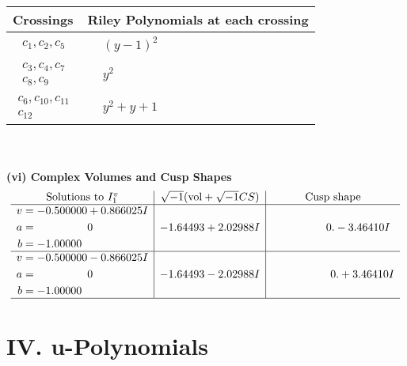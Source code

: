 \documentclass[1p]{elsarticle_modified}
\theoremstyle{definition}
\newcommand{\I}{\sqrt{-1}}
\begin{document}
\begin{tabular}{m{50pt}|m{274pt}}
Crossings & \hspace{64pt}Riley Polynomials at each crossing \\
\hline $$\begin{aligned}c_{1},c_{2},c_{5}\end{aligned}$$&$\begin{aligned}
&(y-1)^2
\end{aligned}$\\
\hline $$\begin{aligned}c_{3},c_{4},c_{7}\\c_{8},c_{9}\end{aligned}$$&$\begin{aligned}
&y^2
\end{aligned}$\\
\hline $$\begin{aligned}c_{6},c_{10},c_{11}\\c_{12}\end{aligned}$$&$\begin{aligned}
&y^2+y+1
\end{aligned}$\\
\hline
\end{tabular}\\~\\
\newpage\flushleft \textbf{(vi) Complex Volumes and Cusp Shapes}
$$\begin{array}{c|c|c}  
\text{Solutions to }I^v_{1}& \I (\text{vol} + \sqrt{-1}CS) & \text{Cusp shape}\\
 \hline 
\begin{aligned}
v &= -0.500000 + 0.866025 I \\
a &= \phantom{-0.000000 } 0 \\
b &= -1.00000\phantom{ +0.000000I}\end{aligned}
 & -1.64493 + 2.02988 I & \phantom{-0.000000 } 0. - 3.46410 I \\ \hline\begin{aligned}
v &= -0.500000 - 0.866025 I \\
a &= \phantom{-0.000000 } 0 \\
b &= -1.00000\phantom{ +0.000000I}\end{aligned}
 & -1.64493 - 2.02988 I & \phantom{-0.000000 -}0. + 3.46410 I\\
 \hline 
 \end{array}$$\newpage
\newpage\renewcommand{\arraystretch}{1}
\centering \section*{ IV. u-Polynomials}
\end{document}
